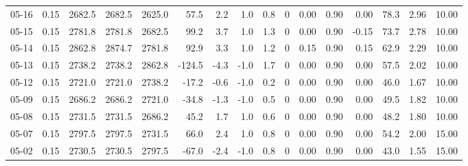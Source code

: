 \begin{threeparttable}
{\begin{tabular}{lrrrrrrrrrrrrrrr}
  05-16 &     0.15 & 2682.5 & 2682.5 & 2625.0 &       57.5 &            2.2 &                      1.0 &                 0.8 &              0 &       0.00 &      0.90 &           0.00 &             78.3 &            2.96 &                  10.00 \\
  05-15 &     0.15 & 2781.8 & 2781.8 & 2682.5 &       99.2 &            3.7 &                      1.0 &                 1.3 &              0 &       0.00 &      0.90 &          -0.15 &             73.7 &            2.78 &                  10.00 \\
  05-14 &     0.15 & 2862.8 & 2874.7 & 2781.8 &       92.9 &            3.3 &                      1.0 &                 1.2 &              0 &       0.15 &      0.90 &           0.15 &             62.9 &            2.29 &                  10.00 \\
  05-13 &     0.15 & 2738.2 & 2738.2 & 2862.8 &     -124.5 &           -4.3 &                     -1.0 &                 1.7 &              0 &       0.00 &      0.90 &           0.00 &             57.5 &            2.02 &                  10.00 \\
  05-12 &     0.15 & 2721.0 & 2721.0 & 2738.2 &      -17.2 &           -0.6 &                     -1.0 &                 0.2 &              0 &       0.00 &      0.90 &           0.00 &             46.0 &            1.67 &                  10.00 \\
  05-09 &     0.15 & 2686.2 & 2686.2 & 2721.0 &      -34.8 &           -1.3 &                     -1.0 &                 0.5 &              0 &       0.00 &      0.90 &           0.00 &             49.5 &            1.82 &                  10.00 \\
  05-08 &     0.15 & 2731.5 & 2731.5 & 2686.2 &       45.2 &            1.7 &                      1.0 &                 0.6 &              0 &       0.00 &      0.90 &           0.00 &             48.2 &            1.80 &                  10.00 \\
  05-07 &     0.15 & 2797.5 & 2797.5 & 2731.5 &       66.0 &            2.4 &                      1.0 &                 0.8 &              0 &       0.00 &      0.90 &           0.00 &             54.2 &            2.00 &                  15.00 \\
  05-02 &     0.15 & 2730.5 & 2730.5 & 2797.5 &      -67.0 &           -2.4 &                     -1.0 &                 0.8 &              0 &       0.00 &      0.90 &           0.00 &             43.0 &            1.55 &                  15.00 \\

\end{tabular}}
\end{threeparttable}

